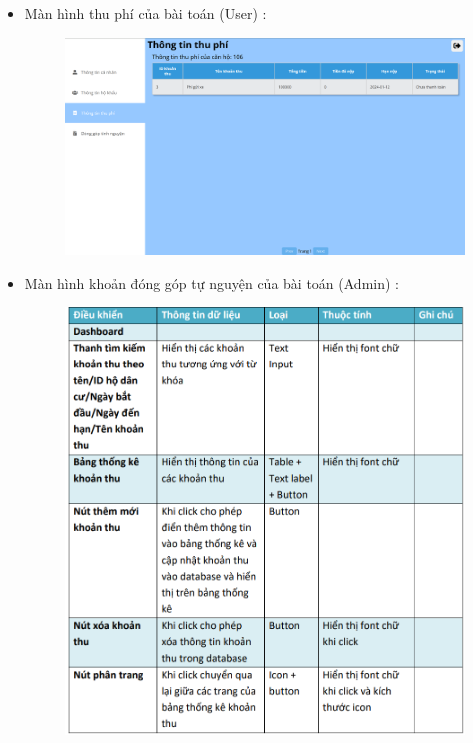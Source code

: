 \documentclass{article}
\begin{document}
\begin{itemize}
\begin{figure}[H]
    \end{figure}
    \vspace{3cm}
    \item Màn hình thu phí của bài toán (User) :
    \begin{figure}[H]
        \centering
        \includegraphics[width=1\textwidth]{Ảnh chương 4/Thông tin thu phí User.png}
    \end{figure}
    \vspace{2cm}
    \item Màn hình khoản đóng góp tự nguyện của bài toán (Admin) :
    \begin{figure}[H]
        \centering
        \includegraphics[width=1\textwidth]{Ảnh chương 4/Tình nguyện Admin.png}

\end{figure}
\end{itemize}
\end{document}
